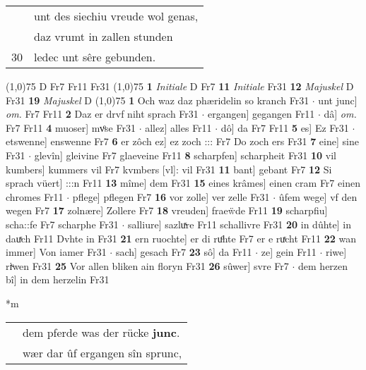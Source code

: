 \documentclass[8pt,a4paper,notitlepage]{article}
\begin{document}
\begin{table}[ht]
\begin{minipage}[t]{0.5\linewidth}
\begin{tabular}{rl}
 & unt des siechiu vreude wol genas,\\ 
 & daz vrumt in zallen stunden\\ 
30 & ledec unt sêre gebunden.\\ 
\end{tabular}
\scriptsize
\line(1,0){75} \newline
D Fr7 Fr11 Fr31 \newline
\line(1,0){75} \newline
\textbf{1} \textit{Initiale} D Fr7  \textbf{11} \textit{Initiale} Fr31  \textbf{12} \textit{Majuskel} D Fr31  \textbf{19} \textit{Majuskel} D  \newline
\line(1,0){75} \newline
\textbf{1} Och waz daz phæridelin so kranch Fr31  $\cdot$ unt junc] \textit{om.} Fr7 Fr11 \textbf{2} Daz er drvf niht sprach Fr31  $\cdot$ ergangen] gegangen Fr11  $\cdot$ dâ] \textit{om.} Fr7 Fr11 \textbf{4} muoser] mvͦse Fr31  $\cdot$ allez] alles Fr11  $\cdot$ dô] da Fr7 Fr11 \textbf{5} es] Ez Fr31  $\cdot$ etswenne] enswenne Fr7 \textbf{6} er zôch ez] ez zoch ::: Fr7 Do zoch ers Fr31 \textbf{7} eine] sine Fr31  $\cdot$ glevîn] gleivine Fr7 glaeveine Fr11 \textbf{8} scharpfen] scharpheit Fr31 \textbf{10} vil kumbers] kummers vil Fr7 kvmbers [vl]: vil Fr31 \textbf{11} bant] gebant Fr7 \textbf{12} Si sprach vüert] :::n Fr11 \textbf{13} mîme] dem Fr31 \textbf{15} eines krâmes] einen cram Fr7 einen chromes Fr11  $\cdot$ pflege] pflegen Fr7 \textbf{16} vor zolle] ver zelle Fr31  $\cdot$ ûfem wege] vf den wegen Fr7 \textbf{17} zolnære] Zollere Fr7 \textbf{18} vreuden] fraeẅde Fr11 \textbf{19} scharpfiu] scha::fe Fr7 scharphe Fr31  $\cdot$ salliure] sazluͯre Fr11 schallivre Fr31 \textbf{20} in dûhte] in dauͯch Fr11 Dvhte in Fr31 \textbf{21} ern ruochte] er di ruͦhte Fr7 er e ruͯcht Fr11 \textbf{22} wan immer] Von iamer Fr31  $\cdot$ sach] gesach Fr7 \textbf{23} sô] da Fr11  $\cdot$ ze] gein Fr11  $\cdot$ riwe] riͮwen Fr31 \textbf{25} Vor allen bliken ain floryn Fr31 \textbf{26} sûwer] svre Fr7  $\cdot$ dem herzen bî] in dem herzelin Fr31 \newline
\end{minipage}
\hspace{0.5cm}
\begin{minipage}[t]{0.5\linewidth}
\small
\begin{center}*m
\end{center}
\begin{tabular}{rl}
 & dem pferde was der rücke \textbf{junc}.\\ 
 & wær dar ûf ergangen sîn sprunc,\\ 

\end{tabular}
\end{minipage}
\end{table}
\end{document}
